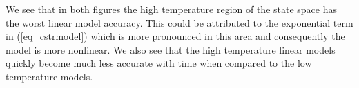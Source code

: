 \documentclass[../masters.tex]{subfiles}
\begin{document}
We see that in both figures the high temperature region of the state space has the worst linear model accuracy. This could be attributed to the exponential term in (\ref{eq_cstrmodel}) which is more pronounced in this area and consequently the model is more nonlinear. We also see that the high temperature linear models quickly become much less accurate with time when compared to the low temperature models.


%
%
\end{document}
